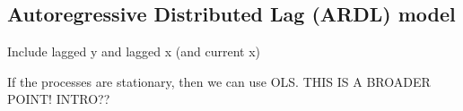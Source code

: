 
\subsection{Autoregressive Distributed Lag (ARDL) model}

Include lagged y and lagged x (and current x)

If the processes are stationary, then we can use OLS. THIS IS A BROADER POINT! INTRO??



